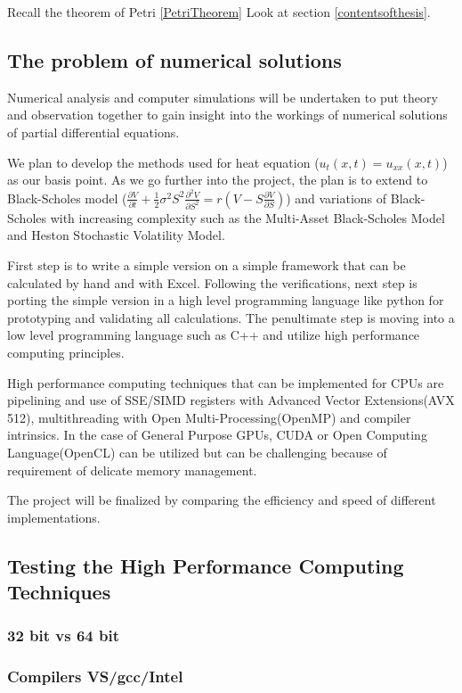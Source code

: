 \documentclass[12pt, oneside]{book}
\theoremstyle{plain}
\theoremstyle{definition}
\begin{document}
Recall the theorem of Petri \ref{PetriTheorem}
Look at section \ref{contentsofthesis}.

\subsection{The problem of numerical solutions}
Numerical analysis and computer simulations will be undertaken to put theory and observation together to gain insight into the workings of numerical solutions of partial differential equations.

We plan to develop the methods used for heat equation (${u_t(x,t)=u_{xx}(x,t)}$) as our basis point. As we go further into the project, the plan is to extend to Black-Scholes model ($\frac{\partial V}{\partial t} + \frac{1}{2}\sigma^2 S^2 \frac{\partial^2 V}{\partial S^2} = r(V - S \frac{\partial V}{\partial S})$)  and variations of Black-Scholes with increasing complexity such as the Multi-Asset Black-Scholes Model and Heston Stochastic Volatility Model.

First step is to write a simple version on a simple framework that can be calculated by hand and with Excel. Following the verifications, next step is porting the simple version in a high level programming language like python for prototyping and validating all calculations. The penultimate step is moving into a low level programming language such as C++ and utilize high performance computing principles.

High performance computing techniques that can be implemented for CPUs are pipelining and use of SSE/SIMD\cite{kusswurm} registers with Advanced Vector Extensions(AVX 512), multithreading with Open Multi-Processing(OpenMP) and compiler intrinsics. In the case of General Purpose GPUs, CUDA or Open Computing Language(OpenCL) can be utilized but can be challenging because of requirement of delicate memory management.

The project will be finalized by comparing the efficiency and speed of different implementations.


\subsection{Testing the High Performance Computing Techniques}
\subsubsection{32 bit vs 64 bit}
\lipsum[5]
\subsubsection{Compilers VS/gcc/Intel}
\lipsum[5]
\end{document}
